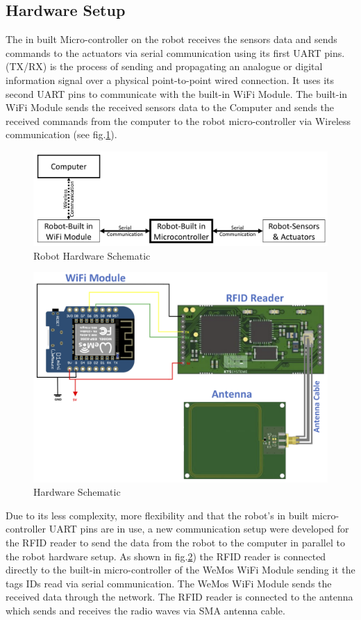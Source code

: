 \subsection{Hardware Setup}
The in built Micro-controller on the robot receives the sensors data and sends commands to the actuators via serial communication using its first UART pins. (TX/RX) is the process of sending and propagating an analogue or digital information signal over a physical point-to-point wired connection. It uses its second UART pins to communicate with the built-in WiFi Module. The built-in WiFi Module sends the received sensors data to the Computer and sends the received commands from the computer to the robot micro-controller via Wireless communication (see fig.\ref{robo_schematic}).
\begin{figure}[!htbp]
	\centering
	\includegraphics[width = 13cm]{Pictures/roboschematic}
	\caption{Robot Hardware Schematic}
	\label{robo_schematic}
\end{figure}
\begin{figure}[!htbp]
	\centering
	\includegraphics[width = 13cm]{Pictures/hwschematic}
	\caption{Hardware Schematic}
	\label{hw_schematic}
\end{figure}
Due to its less complexity, more flexibility and that the robot's in built micro-controller UART pins  are in use, a new communication setup were developed for the RFID reader to send the data from the robot to the computer in parallel to the robot hardware setup. As shown in fig.\ref{hw_schematic}) the RFID reader is connected directly to the built-in micro-controller of the WeMos WiFi Module sending it the tags IDs read via serial communication. The WeMos WiFi Module sends the received data through the network. The RFID reader is connected to the antenna which sends and receives the radio waves via SMA antenna cable.\\
